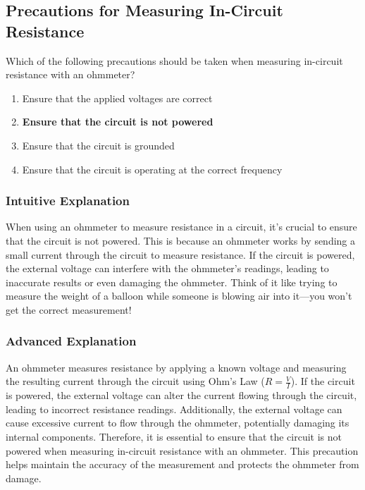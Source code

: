 \subsection{Precautions for Measuring In-Circuit Resistance}
\label{T7D11}

\begin{tcolorbox}[colback=gray!10!white,colframe=black!75!black,title=T7D11]
Which of the following precautions should be taken when measuring in-circuit resistance with an ohmmeter?
\begin{enumerate}[noitemsep]
    \item Ensure that the applied voltages are correct
    \item \textbf{Ensure that the circuit is not powered}
    \item Ensure that the circuit is grounded
    \item Ensure that the circuit is operating at the correct frequency
\end{enumerate}
\end{tcolorbox}

\subsubsection*{Intuitive Explanation}
When using an ohmmeter to measure resistance in a circuit, it's crucial to ensure that the circuit is not powered. This is because an ohmmeter works by sending a small current through the circuit to measure resistance. If the circuit is powered, the external voltage can interfere with the ohmmeter's readings, leading to inaccurate results or even damaging the ohmmeter. Think of it like trying to measure the weight of a balloon while someone is blowing air into it—you won't get the correct measurement!

\subsubsection*{Advanced Explanation}
An ohmmeter measures resistance by applying a known voltage and measuring the resulting current through the circuit using Ohm's Law (\( R = \frac{V}{I} \)). If the circuit is powered, the external voltage can alter the current flowing through the circuit, leading to incorrect resistance readings. Additionally, the external voltage can cause excessive current to flow through the ohmmeter, potentially damaging its internal components. Therefore, it is essential to ensure that the circuit is not powered when measuring in-circuit resistance with an ohmmeter. This precaution helps maintain the accuracy of the measurement and protects the ohmmeter from damage.